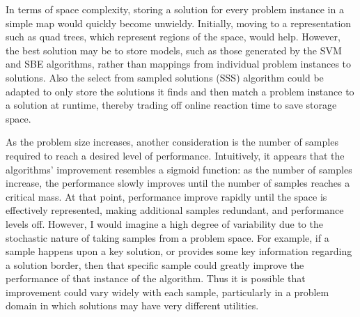 In terms of space complexity, storing a solution for every problem instance in a simple map would quickly become unwieldy. Initially, moving to a representation such as quad trees, which represent regions of the space, would help.  However, the best solution may be to store models, such as those generated by the SVM and SBE algorithms, rather than mappings from individual problem instances to solutions.  Also the select from sampled solutions (SSS) algorithm could be adapted to only store the solutions it finds and then match a problem instance to a solution at runtime, thereby trading off online reaction time to save storage space.

As the problem size increases, another consideration is the number of samples required to reach a desired level of performance.  Intuitively, it appears that the algorithms' improvement resembles a sigmoid function: as the number of samples increase, the performance slowly improves until the number of samples reaches a critical mass. At that point, performance improve rapidly until the space is effectively represented, making additional samples redundant, and performance levels off. However, I would imagine a high degree of variability due to the stochastic nature of taking samples from a problem space.  For example, if a sample happens upon a key solution, or provides some key information regarding a solution border, then that specific sample could greatly improve the performance of that instance of the algorithm.  Thus it is possible that improvement could vary widely with each sample, particularly in a problem domain in which solutions may have very different utilities.



